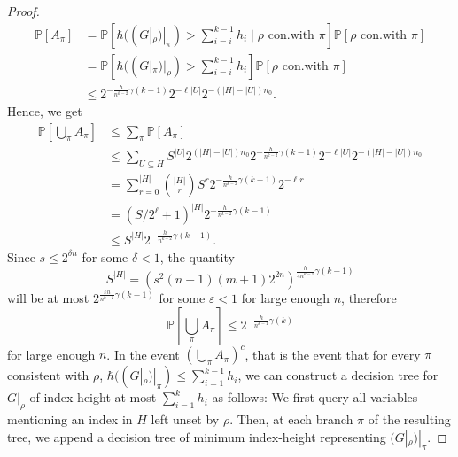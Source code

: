 \documentclass[10pt,a4paper]{article}
\begin{document}
\begin{proof}
\begin{align*}
\mathbb P[A_\pi]&=\mathbb P\left[\hbar((G|_\rho)|_\pi)>\sum_{i=i}^{k-1}h_i\mid\rho\text{ con.with }\pi\right]\mathbb P[\rho\text{ con.with }\pi]\\
&=\mathbb P\left[\hbar((G|_\pi)|_\rho)>\sum_{i=i}^{k-1}h_i\right]\mathbb P[\rho\text{ con.with }\pi]\\
&\le2^{-\frac h{n^{k-2}}\gamma(k-1)}2^{-\ell|U|}2^{-(|H|-|U|)n_0}.
\end{align*}
Hence, we get
\begin{align*}
\mathbb P\left[\bigcup_\pi A_\pi\right]&\le\sum_\pi\mathbb P[A_\pi]\\
&\le\sum_{U\subseteq H}S^{|U|}2^{(|H|-|U|)n_0}2^{-\frac h{n^{k-2}}\gamma(k-1)}2^{-\ell|U|}2^{-(|H|-|U|)n_0}\\
&=\sum_{r=0}^{|H|}\binom{|H|}{r}S^r2^{-\frac h{n^{k-2}}\gamma(k-1)}2^{-\ell r}\\
&=(S/2^\ell+1)^{|H|}2^{-\frac h{n^{k-2}}\gamma(k-1)}\\
&\le S^{|H|}2^{-\frac h{n^{k-2}}\gamma(k-1)}.
\end{align*}
Since $s\le2^{\delta n}$ for some $\delta<1$, the quantity
\[S^{|H|}=\left(s^2(n+1)(m+1)2^{2n}\right)^{\frac h{4n^{k-1}}\gamma(k-1)}\]
will be at most $2^{\frac{\varepsilon h}{n^{k-2}}\gamma(k-1)}$ for some $\varepsilon<1$ for large enough $n$, therefore
\[\mathbb P\left[\bigcup_\pi A_\pi\right]\le2^{-\frac h{n^{k-1}}\gamma(k)}\]
for large enough $n$.
In the event $\left(\bigcup_\pi A_\pi\right)^c$, that is the event that for every $\pi$ consistent with $\rho$, $\hbar((G|_\rho)|_\pi)\le\sum_{i=1}^{k-1}h_i$, we can construct a decision tree for $G|_\rho$ of index-height at most $\sum_{i=1}^kh_i$ as follows: We first query all variables mentioning an index in $H$ left unset by $\rho$. Then, at each branch $\pi$ of the resulting tree, we append a decision tree of minimum index-height representing $(G|_\rho)|_\pi$.
\end{proof}
\end{document}
